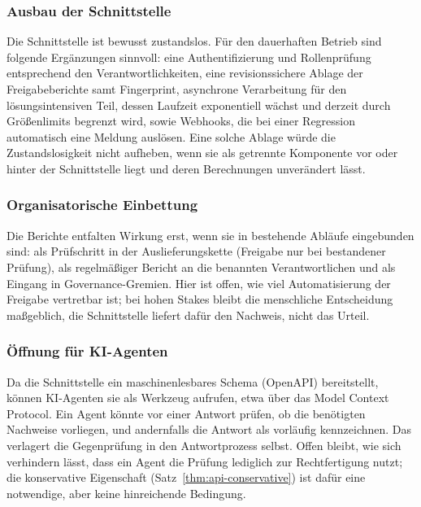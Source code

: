 \documentclass[a4paper,12pt]{article}
\theoremstyle{definition}
\begin{document}
\subsubsection{Ausbau der Schnittstelle}
Die Schnittstelle ist bewusst zustandslos. Für den dauerhaften Betrieb sind folgende Ergänzungen sinnvoll: eine Authentifizierung und Rollenprüfung entsprechend den Verantwortlichkeiten, eine revisionssichere Ablage der Freigabeberichte samt Fingerprint, asynchrone Verarbeitung für den lösungsintensiven Teil, dessen Laufzeit exponentiell wächst und derzeit durch Größenlimits begrenzt wird, sowie Webhooks, die bei einer Regression automatisch eine Meldung auslösen. Eine solche Ablage würde die Zustandslosigkeit nicht aufheben, wenn sie als getrennte Komponente vor oder hinter der Schnittstelle liegt und deren Berechnungen unverändert lässt.

\subsubsection{Organisatorische Einbettung}
Die Berichte entfalten Wirkung erst, wenn sie in bestehende Abläufe eingebunden sind: als Prüfschritt in der Auslieferungskette (Freigabe nur bei bestandener Prüfung), als regelmäßiger Bericht an die benannten Verantwortlichen und als Eingang in Governance-Gremien. Hier ist offen, wie viel Automatisierung der Freigabe vertretbar ist; bei hohen Stakes bleibt die menschliche Entscheidung maßgeblich, die Schnittstelle liefert dafür den Nachweis, nicht das Urteil.

\subsubsection{Öffnung für KI-Agenten}
Da die Schnittstelle ein maschinenlesbares Schema (OpenAPI) bereitstellt, können KI-Agenten sie als Werkzeug aufrufen, etwa über das Model Context Protocol. Ein Agent könnte vor einer Antwort prüfen, ob die benötigten Nachweise vorliegen, und andernfalls die Antwort als vorläufig kennzeichnen. Das verlagert die Gegenprüfung in den Antwortprozess selbst. Offen bleibt, wie sich verhindern lässt, dass ein Agent die Prüfung lediglich zur Rechtfertigung nutzt; die konservative Eigenschaft (Satz~\ref{thm:api-conservative}) ist dafür eine notwendige, aber keine hinreichende Bedingung.
\end{document}
